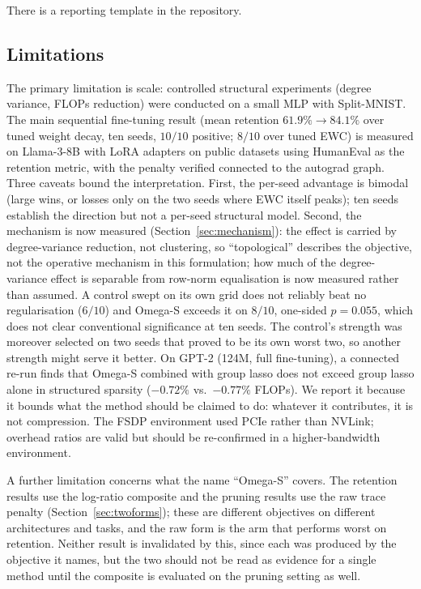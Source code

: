 \documentclass[11pt,a4paper]{article}
\begin{document}
There is a reporting template in the repository.

\subsection{Limitations}

\label{sec:lim}
\label{sec:limits}

The primary limitation is scale: controlled structural experiments
(degree variance, FLOPs reduction) were conducted on a small MLP with
Split-MNIST. The main sequential fine-tuning result (mean retention
$61.9\%\to84.1\%$ over tuned weight decay, ten seeds, $10/10$ positive; $8/10$
over tuned EWC) is measured on Llama-3-8B with LoRA adapters on public
datasets using HumanEval as the retention metric, with the penalty verified
connected to the autograd graph. Three caveats bound the interpretation.
First, the per-seed advantage is bimodal (large wins, or losses only on the
two seeds where EWC itself peaks); ten seeds establish the direction but not
a per-seed structural model. Second, the mechanism is now measured
(Section~\ref{sec:mechanism}): the effect is carried by degree-variance
reduction, not clustering, so ``topological'' describes the objective, not
the operative mechanism in this formulation; how much of the degree-variance
effect is separable from row-norm equalisation is now measured rather than
assumed. A control swept on its own grid does not reliably beat no
regularisation ($6/10$) and Omega-S exceeds it on $8/10$, one-sided
$p=0.055$, which does not clear conventional significance at ten seeds. The
control's strength was moreover selected on two seeds that proved to be its
own worst two, so another strength might serve it better. On
GPT-2 (124M, full fine-tuning), a connected re-run finds that Omega-S
combined with group lasso does not exceed group lasso alone in structured
sparsity ($-0.72\%$ vs.\ $-0.77\%$ FLOPs). We report it because it bounds what
the method should be claimed to do: whatever it contributes, it is not
compression. The
FSDP environment used PCIe rather than NVLink; overhead ratios are valid but
should be re-confirmed in a higher-bandwidth environment.

A further limitation concerns what the name ``Omega-S'' covers. The
retention results use the log-ratio composite and the pruning results use the
raw trace penalty (Section~\ref{sec:twoforms}); these are different
objectives on different architectures and tasks, and the raw form is the arm
that performs worst on retention. Neither result is invalidated by this, since
each was produced by the objective it names, but the two should not be read as
evidence for a single method until the composite is evaluated on the pruning
setting as well.
\end{document}
